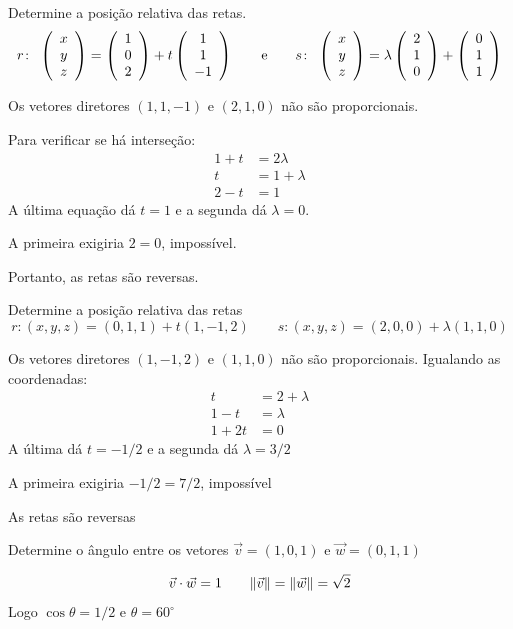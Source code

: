 \documentclass[a4paper,12pt,fleqn]{article}
\begin{document}

Determine a posição relativa das retas.
\[
  r\colon\ \left(\begin{array}{c} x \\ y \\ z \end{array}\right) = \left(\begin{array}{c} 1 \\ 0 \\ 2 \end{array}\right) + t\left(\begin{array}{c} 1 \\ 1 \\ -1 \end{array}\right)
  \qquad\text{e}\qquad
  s\colon\ \left(\begin{array}{c} x \\ y \\ z \end{array}\right) = \lambda\left(\begin{array}{c} 2 \\ 1 \\ 0 \end{array}\right) + \left(\begin{array}{c} 0 \\ 1 \\ 1 \end{array}\right)
\]

\begin{answer}
  Os vetores diretores $(1, 1, -1)$ e $(2, 1, 0)$ não são proporcionais.

  Para verificar se há interseção:
  \begin{align*}
    1+t & =2\lambda  \\
    t   & =1+\lambda \\
    2-t & =1
  \end{align*}
  A última equação dá $t=1$ e a segunda dá $\lambda=0$.

  A primeira exigiria $2=0$, impossível.

  Portanto, as retas são reversas.
\end{answer}

Determine a posição relativa das retas
\[
  r\colon (x, y, z) = (0, 1, 1) + t(1, -1, 2) \qquad
  s\colon (x, y, z) = (2, 0, 0) + \lambda(1, 1, 0)
\]

\begin{answer}
  Os vetores diretores $(1,-1,2)$ e $(1,1,0)$ não são proporcionais. Igualando as coordenadas:
  \begin{align*}
    t    & =2+\lambda \\
    1-t  & =\lambda   \\
    1+2t & =0
  \end{align*}
  A última dá $t=-1/2$ e a segunda dá $\lambda=3/2$

  A primeira exigiria $-1/2=7/2$, impossível

  As retas são reversas
\end{answer}

Determine o ângulo entre os vetores $\vec{v}=(1,0,1)$ e $\vec{w}=(0,1,1)$

\begin{answer}
  \[
    \vec{v}\cdot\vec{w}=1
    \qquad
    \norm{\vec{v}}=\norm{\vec{w}}=\sqrt{2}
  \]
  Logo $\cos\theta=1/2$ e $\theta=60^\circ$
\end{answer}
\end{document}
